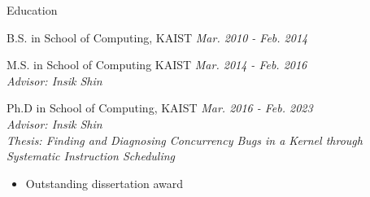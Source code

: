 
\begin{rSection}{Education}

B.S. in School of Computing, KAIST \hfill {\em Mar. 2010 - Feb. 2014}

M.S. in School of Computing KAIST \hfill {\em Mar. 2014 - Feb. 2016} \\
\textit{Advisor: Insik Shin}

Ph.D in School of Computing, KAIST \hfill {\em Mar. 2016 - Feb. 2023} \\
\textit{Advisor: Insik Shin} \\
\textit{Thesis: Finding and Diagnosing Concurrency Bugs in a Kernel through Systematic Instruction Scheduling}

\begin{itemize}
  \item{Outstanding  dissertation award}
\end{itemize}

\end{rSection}
